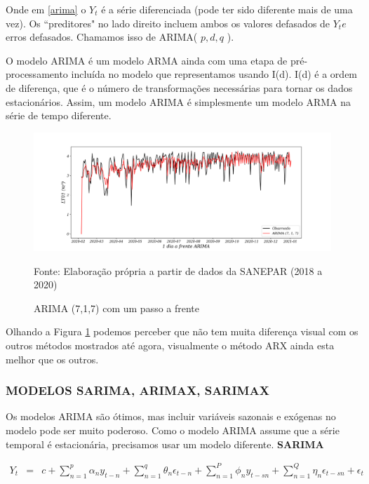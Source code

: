 Onde em \eqref{arima} o $Y_t$ é a série diferenciada (pode ter sido diferente mais de uma vez). Os ``preditores" no lado direito incluem ambos os valores defasados de $Y_t e$ erros defasados. Chamamos isso de ARIMA( $p, d, q$ ).

O modelo ARIMA é um modelo ARMA ainda com uma etapa de pré-processamento incluída no modelo que representamos usando I(d). I(d) é a ordem de diferença, que é o número de transformações necessárias para tornar os dados estacionários. Assim, um modelo ARIMA é simplesmente um modelo ARMA na série de tempo diferente.

\begin{figure}[H]
	\centering
	\caption{ARIMA (7,1,7) com um passo a frente}
	\label{fig:1-arima}
	\includegraphics[width=1\linewidth]{Modelos/Figuras/1-ARIMA}
	
	Fonte: Elaboração própria a partir de dados da SANEPAR (2018 a 2020)
\end{figure}

Olhando a Figura \ref{fig:1-arima} podemos perceber que não tem muita diferença visual com os outros métodos mostrados até agora, visualmente o método ARX ainda esta melhor que os outros.  


\subsubsection{MODELOS SARIMA, ARIMAX, SARIMAX}

Os modelos ARIMA são ótimos, mas incluir variáveis sazonais e exógenas no modelo pode ser muito poderoso. Como o modelo ARIMA assume que a série temporal é estacionária, precisamos usar um modelo diferente.
\textbf{SARIMA}

\begin{eqnarray}
	Y_t&=&c+\sum_{n=1}^p \alpha_n y_{t-n}+\sum_{n=1}^q \theta_n \epsilon_{t-n}+\sum_{n=1}^P \phi_n y_{t-s n}+\sum_{n=1}^Q \eta_n \epsilon_{t-s n}+\epsilon_t \label{sarima}
\end{eqnarray}

